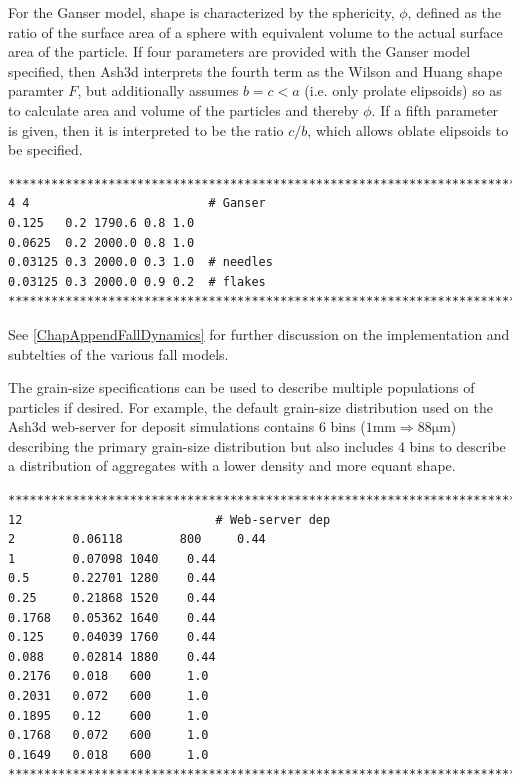 \normalsize
For the Ganser model, shape is characterized by the sphericity, $\phi$, defined as the
ratio of the surface area of a sphere with equivalent volume to the actual surface area
of the particle.  If four parameters are provided with the Ganser model specified, then
Ash3d interprets the fourth term as the Wilson and Huang shape paramter $F$, but
additionally assumes $b=c<a$ (i.e. only prolate elipsoids) so as to calculate area and
volume of the particles and thereby $\phi$.
If a fifth parameter is given, then it is interpreted to 
be the ratio $c/b$, which allows oblate elipsoids to be specified.
\small
\begin{verbatim}
*******************************************************************************
4 4                         # Ganser
0.125   0.2 1790.6 0.8 1.0
0.0625  0.2 2000.0 0.8 1.0
0.03125 0.3 2000.0 0.3 1.0  # needles
0.03125 0.3 2000.0 0.9 0.2  # flakes
*******************************************************************************
\end{verbatim}
\normalsize
See \ref{ChapAppendFallDynamics} for further discussion on the implementation and subtelties of the various
fall models.

The grain-size specifications can be used to describe multiple populations of particles
if desired.  For example, the default grain-size distribution used on the Ash3d
web-server for deposit simulations contains 6 bins
($1 \mathrm{mm} \Rightarrow 88 \mathrm{\mu m}$) describing the primary grain-size distribution
but also includes 4 bins to describe a distribution of aggregates with a lower density
and more equant shape.
\small
\begin{verbatim}
*******************************************************************************
12                           # Web-server dep
2        0.06118        800     0.44
1        0.07098 1040    0.44
0.5      0.22701 1280    0.44
0.25     0.21868 1520    0.44
0.1768   0.05362 1640    0.44
0.125    0.04039 1760    0.44
0.088    0.02814 1880    0.44
0.2176   0.018   600     1.0
0.2031   0.072   600     1.0
0.1895   0.12    600     1.0
0.1768   0.072   600     1.0
0.1649   0.018   600     1.0
*******************************************************************************
\end{verbatim}
\normalsize

